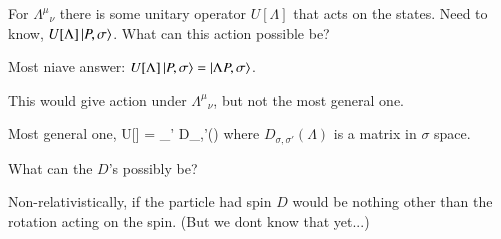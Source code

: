 {For ${\Lambda^\mu}_\nu$ there is some unitary operator $U[\Lambda]$ that acts on the states.
Need to know, $U[\Lambda] \ket{P, \sigma}$.
What can this action possible be?

Most niave answer:  $U[\Lambda] \ket{P, \sigma} = \ket{\Lambda P, \sigma}$.

This would give action under ${\Lambda^\mu}_\nu$, but not the most general one.

Most general one,
\be
U[\Lambda]  = \sum_{\sigma'} D_{\sigma,\sigma'}(\Lambda) 
\ee
where $D_{\sigma,\sigma'}(\Lambda)$ is a matrix in $\sigma$ space.

What can the $D$'s possibly be?

Non-relativistically, if the particle had spin $D$ would be nothing other than the rotation acting on the spin. (But we dont know that yet...)



}
